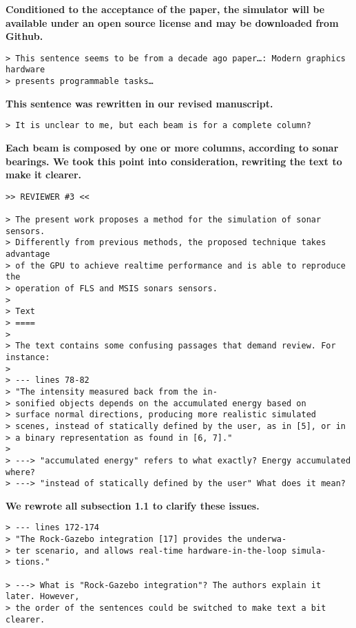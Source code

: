 \documentclass{article}
\begin{document}
\textbf{Conditioned to the acceptance of the paper, the simulator will be available 
under an open source license and may be downloaded from Github.}

\begin{verbatim}
> This sentence seems to be from a decade ago paper…: Modern graphics hardware
> presents programmable tasks…
\end{verbatim}

\textbf{This sentence was rewritten in our revised manuscript.}

\begin{verbatim}
> It is unclear to me, but each beam is for a complete column?
\end{verbatim}

\textbf{Each beam is composed by one or more columns, according to sonar
bearings. We took this point into consideration, rewriting the text to make 
it clearer.}

\begin{verbatim}
>> REVIEWER #3 <<

> The present work proposes a method for the simulation of sonar sensors.
> Differently from previous methods, the proposed technique takes advantage
> of the GPU to achieve realtime performance and is able to reproduce the
> operation of FLS and MSIS sonars sensors.
>
> Text
> ====
>
> The text contains some confusing passages that demand review. For instance:
>
> --- lines 78-82
> "The intensity measured back from the in-
> sonified objects depends on the accumulated energy based on
> surface normal directions, producing more realistic simulated
> scenes, instead of statically defined by the user, as in [5], or in
> a binary representation as found in [6, 7]."
>
> ---> "accumulated energy" refers to what exactly? Energy accumulated where?
> ---> "instead of statically defined by the user" What does it mean?
\end{verbatim}

\textbf{We rewrote all subsection 1.1 to clarify these issues.}

\begin{verbatim}
> --- lines 172-174
> "The Rock-Gazebo integration [17] provides the underwa-
> ter scenario, and allows real-time hardware-in-the-loop simula-
> tions."

> ---> What is "Rock-Gazebo integration"? The authors explain it later. However,
> the order of the sentences could be switched to make text a bit clearer.
\end{verbatim}
\end{document}
